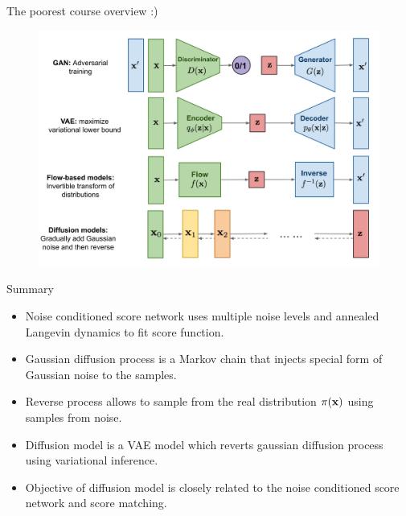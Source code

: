 \begin{frame}{The poorest course overview :)}
	\begin{figure}
		\includegraphics[width=\linewidth]{figs/generative-overview}
	\end{figure}
\end{frame}
\begin{frame}{Summary}
	\begin{itemize}
		\item Noise conditioned score network uses multiple noise levels and annealed Langevin dynamics to fit score function.
		\vfill
		\item Gaussian diffusion process is a Markov chain that injects special form of Gaussian noise to the samples.
		\vfill
		\item Reverse process allows to sample from the real distribution $\pi(\mathbf{x})$ using samples from noise.
		\vfill
		\item Diffusion model is a VAE model which reverts gaussian diffusion process using variational inference.
		\vfill
		\item Objective of diffusion model is closely related to the noise conditioned score network and score matching.
	\end{itemize}
\end{frame}
 